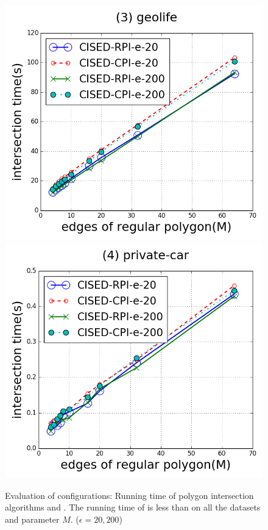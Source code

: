 \begin{figure}[tb!]
\includegraphics[scale = 0.250]{figures/Exp-M-poly-time-geolife.png}
\includegraphics[scale = 0.250]{figures/Exp-M-poly-time-private.png}
\vspace{-2ex}
\caption{\small Evaluation of configurations: Running time of polygon intersection algorithms \rpia and \cpia. The running time of \rpia is less than \cpia on all the datasets and parameter $M$. ($\epsilon = 20, 200$)}
\label{fig:m-poly-time}
\vspace{-1ex}
\end{figure}

